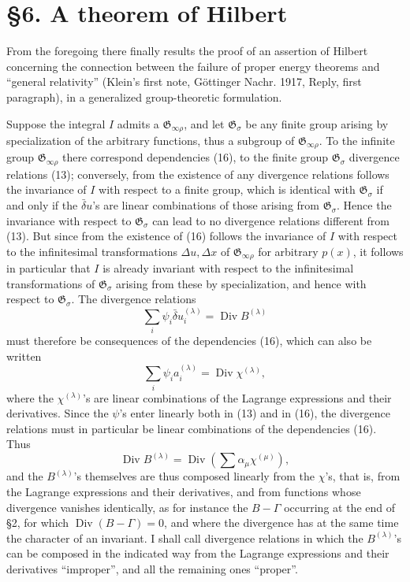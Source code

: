 \documentclass[11pt]{article}
\newcommand{\D}{\Delta}
\providecommand{\Div}{\operatorname{Div}}
\providecommand{\G}{\mathfrak G}
\providecommand{\bd}{\bar{\delta}}
\begin{document}
\section*{\S{}6. A theorem of Hilbert}

From the foregoing there finally results the proof of an assertion of Hilbert concerning the connection between the failure of proper energy theorems and ``general relativity'' (Klein's first note, Göttinger Nachr. 1917, Reply, first paragraph), in a generalized group-theoretic formulation.

Suppose the integral \(I\) admits a \(\G_{\infty\rho}\), and let \(\G_\sigma\) be any finite group arising by specialization of the arbitrary functions, thus a subgroup of \(\G_{\infty\rho}\). To the infinite group \(\G_{\infty\rho}\) there correspond dependencies (16), to the finite group \(\G_\sigma\) divergence relations (13); conversely, from the existence of any divergence relations follows the invariance of \(I\) with respect to a finite group, which is identical with \(\G_\sigma\) if and only if the \(\bd u\)'s are linear combinations of those arising from \(\G_\sigma\). Hence the invariance with respect to \(\G_\sigma\) can lead to no divergence relations different from (13). But since from the existence of (16) follows the invariance of \(I\) with respect to the infinitesimal transformations \(\D u,\D x\) of \(\G_{\infty\rho}\) for arbitrary \(p(x)\), it follows in particular that \(I\) is already invariant with respect to the infinitesimal transformations of \(\G_\sigma\) arising from these by specialization, and hence with respect to \(\G_\sigma\). The divergence relations
\[
\sum_i\psi_i\bd u_i^{(\lambda)}=\Div B^{(\lambda)}
\]
must therefore be consequences of the dependencies (16), which can also be written
\[
\sum_i\psi_i a_i^{(\lambda)}=\Div\chi^{(\lambda)},
\]
where the \(\chi^{(\lambda)}\)'s are linear combinations of the Lagrange expressions and their derivatives. Since the \(\psi\)'s enter linearly both in (13) and in (16), the divergence relations must in particular be linear combinations of the dependencies (16). Thus
\[
\Div B^{(\lambda)}=\Div\left(\sum \alpha_\mu\chi^{(\mu)}\right),
\]
and the \(B^{(\lambda)}\)'s themselves are thus composed linearly from the \(\chi\)'s, that is, from the Lagrange expressions and their derivatives, and from functions whose divergence vanishes identically, as for instance the \(B-\Gamma\) occurring at the end of \S{}2, for which \(\Div(B-\Gamma)=0\), and where the divergence has at the same time the character of an invariant. I shall call divergence relations in which the \(B^{(\lambda)}\)'s can be composed in the indicated way from the Lagrange expressions and their derivatives ``improper'', and all the remaining ones ``proper''.
\end{document}
